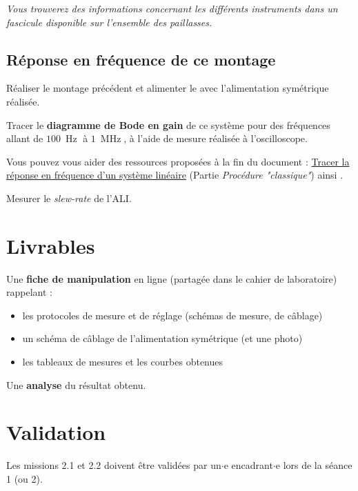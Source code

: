 \textit{Vous trouverez des informations concernant les différents instruments dans un fascicule disponible sur l'ensemble des paillasses.}

\subsection{Réponse en fréquence de ce montage}

\Manip Réaliser le montage précédent et alimenter le avec l'alimentation symétrique réalisée.

\Manip Tracer le \textbf{diagramme de Bode en gain} de ce système pour des fréquences allant de $100~\operatorname{Hz}$ à $1~\operatorname{MHz}$, à l'aide de mesure réalisée à l'oscilloscope. 

Vous pouvez vous aider des ressources proposées à la fin du document : \hyperref[ressource:RepFreq]{Tracer la réponse en fréquence d'un système linéaire} (Partie \textit{Procédure "classique"}) ainsi .

\Manip Mesurer le \textit{slew-rate} de l'ALI.

\section{Livrables}


Une \textbf{fiche de manipulation} en ligne (partagée dans le cahier de laboratoire) rappelant :

\begin{itemize}
	\item les protocoles de mesure et de réglage (schémas de mesure, de câblage)
	\item un schéma de câblage de l'alimentation symétrique (et une photo)	
	\item les tableaux de mesures et les courbes obtenues
\end{itemize}

Une \textbf{analyse} du résultat obtenu.



\section{Validation}

Les missions 2.1 et 2.2 doivent être validées par un$\cdot$e encadrant$\cdot$e lors de la séance 1 (ou 2). 

